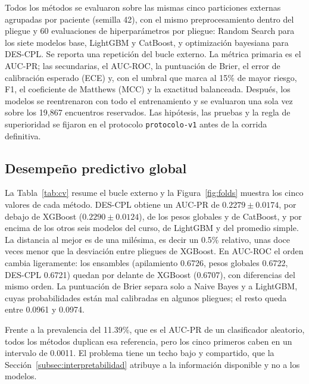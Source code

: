 \documentclass[pdflatex,sn-mathphys-num]{sn-jnl}
\theoremstyle{plain}
\begin{document}
Todos los métodos se evaluaron sobre las mismas cinco particiones externas agrupadas por paciente (semilla 42), con el mismo preprocesamiento dentro del pliegue y 60 evaluaciones de hiperparámetros por pliegue: Random Search para los siete modelos base, LightGBM y CatBoost, y optimización bayesiana para DES-CPL. Se reporta una repetición del bucle externo. La métrica primaria es el AUC-PR; las secundarias, el AUC-ROC, la puntuación de Brier, el error de calibración esperado (ECE) y, con el umbral que marca al 15\% de mayor riesgo, F1, el coeficiente de Matthews (MCC) y la exactitud balanceada. Después, los modelos se reentrenaron con todo el entrenamiento y se evaluaron una sola vez sobre los 19{,}867 encuentros reservados. Las hipótesis, las pruebas y la regla de superioridad se fijaron en el protocolo \texttt{protocolo-v1} antes de la corrida definitiva.

\subsection{Desempeño predictivo global}\label{subsec:desempeno}

La Tabla~\ref{tab:cv} resume el bucle externo y la Figura~\ref{fig:folds} muestra los cinco valores de cada método. DES-CPL obtiene un AUC-PR de $0.2279 \pm 0.0174$, por debajo de XGBoost ($0.2290 \pm 0.0124$), de los pesos globales y de CatBoost, y por encima de los otros seis modelos del curso, de LightGBM y del promedio simple. La distancia al mejor es de una milésima, es decir un 0.5\% relativo, unas doce veces menor que la desviación entre pliegues de XGBoost. En AUC-ROC el orden cambia ligeramente: los ensambles (apilamiento 0.6726, pesos globales 0.6722, DES-CPL 0.6721) quedan por delante de XGBoost (0.6707), con diferencias del mismo orden. La puntuación de Brier separa solo a Naive Bayes y a LightGBM, cuyas probabilidades están mal calibradas en algunos pliegues; el resto queda entre 0.0961 y 0.0974.

Frente a la prevalencia del 11.39\%, que es el AUC-PR de un clasificador aleatorio, todos los métodos duplican esa referencia, pero los cinco primeros caben en un intervalo de 0.0011. El problema tiene un techo bajo y compartido, que la Sección~\ref{subsec:interpretabilidad} atribuye a la información disponible y no a los modelos.
\end{document}
